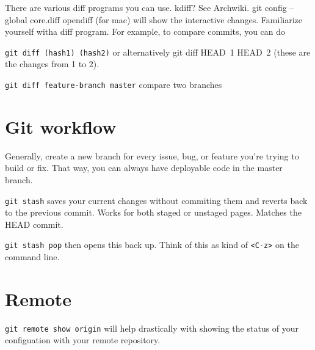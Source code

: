 \documentclass{article}
\begin{document}
There are various diff programs you can use. kdiff? See Archwiki.
git config --global core.diff opendiff (for mac) will show the interactive changes. Familiarize yourself witha diff program. For example, to compare commits, you can do 

\verb|git diff (hash1) (hash2)| or alternatively git diff HEAD~1 HEAD~2 (these are the changes from 1 to 2).

\verb|git diff feature-branch master| compare two branches



\section{Git workflow}
Generally, create a new branch for every issue, bug, or feature you're trying
to build or fix. That way, you can always have deployable code in the master
branch. 

\verb|git stash| saves your current changes without commiting them and reverts back to the previous commit. Works for both staged or unstaged pages. Matches the HEAD commit.

\verb|git stash pop| then opens this back up. Think of this as kind of \verb|<C-z>| on the command line.


\section{Remote}
\verb|git remote show origin| will help drastically with showing the status of your configuation with your remote repository.
\end{document}
